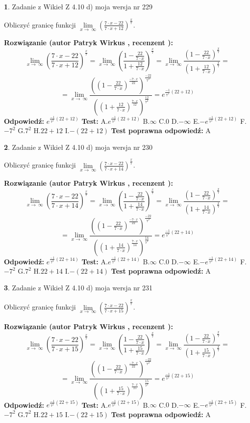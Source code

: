 \documentclass[12pt, a4paper]{article}
\theoremstyle{definition} %
\newtheorem{zad}{}
\newcommand{\zadStart}[1]{\begin{zad}#1\newline}
\newcommand{\zadStop}{\end{zad}}
\newcommand{\rozwStart}[2]{\noindent \textbf{Rozwiązanie (autor #1 , recenzent #2): }\newline}
\newcommand{\rozwStop}{\newline}
\newcommand{\odpStart}{\noindent \textbf{Odpowiedź:}\newline}
\newcommand{\odpStop}{\newline}
\newcommand{\testStart}{\noindent \textbf{Test:}\newline}
\newcommand{\testStop}{\newline}
\newcommand{\kluczStart}{\noindent \textbf{Test poprawna odpowiedź:}\newline}
\newcommand{\kluczStop}{\newline}
\begin{document}
\zadStart{Zadanie z Wikieł Z 4.10 d) moja wersja nr 229}


Obliczyć granicę funkcji  $\lim\limits_{x\to\ \infty}(\frac{7\cdot x-22}{7\cdot x+12})^{\frac{x}{7}}$.
\zadStop
\rozwStart{Patryk Wirkus}{}
$$\lim\limits_{x\to\ \infty}(\frac{7\cdot x-22}{7\cdot x+12})^{\frac{x}{7}} = \lim\limits_{x\to\ \infty}(\frac{1-\frac{22}{7\cdot x}}{1+\frac{12}{7\cdot x}})^{\frac{x}{7}}=\lim\limits_{x\to\ \infty}\frac{(1-\frac{22}{7\cdot x})^{\frac{x}{7}}}{(1+\frac{12}{7\cdot x})^{\frac{x}{7}}}=$$
$$=\lim\limits_{x\to\ \infty}\frac{((1-\frac{22}{7\cdot x})^{\frac{-7\cdot x}{22}})^{\frac{-22}{7^{2}}}}{((1+\frac{12}{7\cdot x})^{\frac{7\cdot x}{12}})^{\frac{12}{7^{2}}}}=e^{\frac{-1}{7^{2}}(22+12)}$$
\rozwStop
\odpStart
$e^{\frac{-1}{7^{2}}(22+12)}$
\odpStop
\testStart
A.$e^{\frac{-1}{7^{2}}(22+12)}$ B.$\infty$ C.$0$ D.$-\infty$ E.$-e^{\frac{-1}{7^{2}}(22+12)}$
F.$-7^{2}$ G.$7^{2}$
H.$22+12$
I.$-(22+12)$
\testStop
\kluczStart
A
\kluczStop



\zadStart{Zadanie z Wikieł Z 4.10 d) moja wersja nr 230}


Obliczyć granicę funkcji  $\lim\limits_{x\to\ \infty}(\frac{7\cdot x-22}{7\cdot x+14})^{\frac{x}{7}}$.
\zadStop
\rozwStart{Patryk Wirkus}{}
$$\lim\limits_{x\to\ \infty}(\frac{7\cdot x-22}{7\cdot x+14})^{\frac{x}{7}} = \lim\limits_{x\to\ \infty}(\frac{1-\frac{22}{7\cdot x}}{1+\frac{14}{7\cdot x}})^{\frac{x}{7}}=\lim\limits_{x\to\ \infty}\frac{(1-\frac{22}{7\cdot x})^{\frac{x}{7}}}{(1+\frac{14}{7\cdot x})^{\frac{x}{7}}}=$$
$$=\lim\limits_{x\to\ \infty}\frac{((1-\frac{22}{7\cdot x})^{\frac{-7\cdot x}{22}})^{\frac{-22}{7^{2}}}}{((1+\frac{14}{7\cdot x})^{\frac{7\cdot x}{14}})^{\frac{14}{7^{2}}}}=e^{\frac{-1}{7^{2}}(22+14)}$$
\rozwStop
\odpStart
$e^{\frac{-1}{7^{2}}(22+14)}$
\odpStop
\testStart
A.$e^{\frac{-1}{7^{2}}(22+14)}$ B.$\infty$ C.$0$ D.$-\infty$ E.$-e^{\frac{-1}{7^{2}}(22+14)}$
F.$-7^{2}$ G.$7^{2}$
H.$22+14$
I.$-(22+14)$
\testStop
\kluczStart
A
\kluczStop



\zadStart{Zadanie z Wikieł Z 4.10 d) moja wersja nr 231}


Obliczyć granicę funkcji  $\lim\limits_{x\to\ \infty}(\frac{7\cdot x-22}{7\cdot x+15})^{\frac{x}{7}}$.
\zadStop
\rozwStart{Patryk Wirkus}{}
$$\lim\limits_{x\to\ \infty}(\frac{7\cdot x-22}{7\cdot x+15})^{\frac{x}{7}} = \lim\limits_{x\to\ \infty}(\frac{1-\frac{22}{7\cdot x}}{1+\frac{15}{7\cdot x}})^{\frac{x}{7}}=\lim\limits_{x\to\ \infty}\frac{(1-\frac{22}{7\cdot x})^{\frac{x}{7}}}{(1+\frac{15}{7\cdot x})^{\frac{x}{7}}}=$$
$$=\lim\limits_{x\to\ \infty}\frac{((1-\frac{22}{7\cdot x})^{\frac{-7\cdot x}{22}})^{\frac{-22}{7^{2}}}}{((1+\frac{15}{7\cdot x})^{\frac{7\cdot x}{15}})^{\frac{15}{7^{2}}}}=e^{\frac{-1}{7^{2}}(22+15)}$$
\rozwStop
\odpStart
$e^{\frac{-1}{7^{2}}(22+15)}$
\odpStop
\testStart
A.$e^{\frac{-1}{7^{2}}(22+15)}$ B.$\infty$ C.$0$ D.$-\infty$ E.$-e^{\frac{-1}{7^{2}}(22+15)}$
F.$-7^{2}$ G.$7^{2}$
H.$22+15$
I.$-(22+15)$
\testStop
\kluczStart
A
\kluczStop
\end{document}
